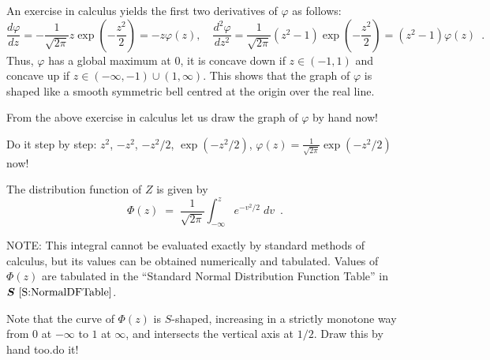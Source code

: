 An exercise in calculus yields the first two derivatives of $\varphi$ as follows:
\[
\frac{d \varphi}{dz} = - \frac{1}{\sqrt{2\pi}}z \exp{\left( -\frac{z^2}{2}\right)}=-z\varphi(z), \quad
\frac{d^2 \varphi}{dz^2} = \frac{1}{\sqrt{2\pi}}(z^2-1) \exp{\left(-\frac{z^2}{2} \right)}=(z^2-1)\varphi(z) \enspace .
\]
Thus, $\varphi$ has a global maximum at $0$, it is concave down if $z \in (-1,1)$ and concave up if $z \in (-\infty,-1) \cup (1,\infty)$.  
This shows that the graph of $\varphi$ is shaped like a smooth symmetric bell centred at the origin over the real line.


\begin{classwork}
From the above exercise in calculus let us draw the graph of $\varphi$ by hand now!

Do it step by step: $z^2$, $-z^2$, $-z^2/2$, $\exp(-z^2/2)$, $\varphi(z) = \frac{1}{\sqrt{2\pi}} \exp(-z^2/2)$ now! 
\vspace*{20mm}
\end{classwork}

The distribution function of $Z$ is given by
\begin{equation}\label{E:StandardNormalDF}
\Phi(z) \;=\;\frac{1}{\sqrt{2\pi}}\int^z_{-\infty}e^{-v^2/2}\;dv \enspace .
\end{equation}

NOTE: {This integral cannot be evaluated exactly by standard methods of calculus, but its values can be
obtained numerically and tabulated.  Values of $\Phi(z)$ are tabulated in the ``Standard Normal Distribution Function Table'' in $\S~\ref{S:NormalDFTable}$.}

\begin{classwork}
{Note that the curve of $\Phi(z)$ is $S$-shaped, increasing in a strictly monotone way from $0$ at $-\infty$ to $1$ at $\infty$, and intersects the vertical axis at $1/2$. Draw this by hand too.}{}{do it! \vspace*{20mm}}
\end{classwork}

